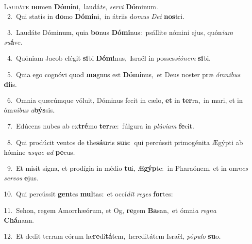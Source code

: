 \lettrine{\initial\textcolor{\initialcolor}{L}}{audáte} \textbf{no}\-men \textbf{Dó}\-\textbf{mi}ni,~\star laudá\-\textit{te}\-, \textit{ser}\-\textit{vi} \textbf{Dó}\-minum.\\
{\numbfont\textcolor{\numbcolor}{~2.}}~Qui statis in \textbf{do}\-mo \textbf{Dó}\-\textbf{mi}ni,~\star in átriis do\textit{mus} \textit{De}\-\textit{i} \textbf{nos}\-tri.\par
{\numbfont\textcolor{\numbcolor}{~3.}}~Laudáte Dóminum, quia \textbf{bo}\-nus \textbf{Dó}\-\textbf{mi}nus:~\star psállite nómini ejus, quón\-\textit{i}\-\textit{am} \textit{su}\-\textbf{á}ve.\par
{\numbfont\textcolor{\numbcolor}{~4.}}~Quóniam Jacob elégit \textbf{si}\-bi \textbf{Dó}\-\textbf{mi}nus,~\star Israël in posses\-\textit{si}\-\textit{ó}\textit{nem} \textbf{si}\-bi.\par
{\numbfont\textcolor{\numbcolor}{~5.}}~Quia ego cognóvi quod \textbf{ma}\-gnus est \textbf{Dó}\-\textbf{mi}nus,~\star et Deus noster præ \textit{óm}\-\textit{ni}\textit{bus} \textbf{di}\-is.\par
{\numbfont\textcolor{\numbcolor}{~6.}}~Omnia quæcúmque vóluit, Dóminus fecit in cælo, \textbf{et} in \textbf{ter}\-ra,~\star in mari, et in óm\-\textit{ni}\-\textit{bus} \textit{a}\-\textbf{býs}sis.\par
{\numbfont\textcolor{\numbcolor}{~7.}}~Edúcens nubes ab ex\-\textbf{tré}\-mo \textbf{ter}\-ræ:~\star fúlgura in \textit{plú}\-\textit{vi}\textit{am} \textbf{fe}\-cit.\par
{\numbfont\textcolor{\numbcolor}{~8.}}~Qui prodúcit ventos de the\-\textbf{sáu}\-ris \textbf{su}\-is:~\star qui percússit primogénita Ægýpti ab hómine \textit{us}\-\textit{que} \textit{ad} \textbf{pe}\-cus.\par
{\numbfont\textcolor{\numbcolor}{~9.}}~Et misit signa, et prodígia in médio \textbf{tu}\-i, Æ\-\textbf{gýp}\-te:~\star in Pharaónem, et in om\textit{nes} \textit{ser}\-\textit{vos} \textbf{e}\-jus.\par
{\numbfont\textcolor{\numbcolor}{10.}}~Qui percússit \textbf{gen}\-tes \textbf{mul}\-tas:~\star et occí\textit{dit} \textit{re}\-\textit{ges} \textbf{for}\-tes:\par
{\numbfont\textcolor{\numbcolor}{11.}}~Sehon, regem Amorrhæórum, et Og, \textbf{re}\-gem \textbf{Ba}\-san,~\star et ómni\textit{a} \textit{re}\-\textit{gna} \textbf{Chá}\-naan.\par
{\numbfont\textcolor{\numbcolor}{12.}}~Et dedit terram eórum he\-\textbf{re}\-di\-\textbf{tá}\-tem,~\star hereditátem Israël, \textit{pó}\-\textit{pu}\textit{lo} \textbf{su}\-o.\par
